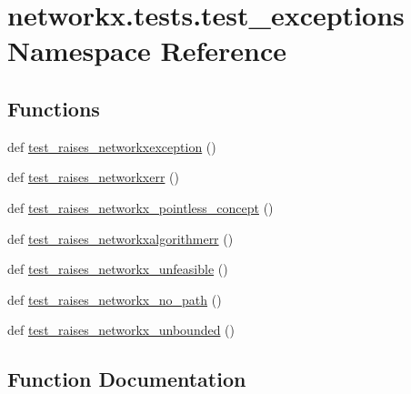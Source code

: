 \hypertarget{namespacenetworkx_1_1tests_1_1test__exceptions}{}\section{networkx.\+tests.\+test\+\_\+exceptions Namespace Reference}
\label{namespacenetworkx_1_1tests_1_1test__exceptions}
\subsection*{Functions}
\begin{DoxyCompactItemize}
\item 
def \hyperlink{namespacenetworkx_1_1tests_1_1test__exceptions_a3899a490542c69a90b205bf33e623ec0}{test\+\_\+raises\+\_\+networkxexception} ()
\item 
def \hyperlink{namespacenetworkx_1_1tests_1_1test__exceptions_a3281e283e10f5ff390b13fbab7ab0fc6}{test\+\_\+raises\+\_\+networkxerr} ()
\item 
def \hyperlink{namespacenetworkx_1_1tests_1_1test__exceptions_a96cf48dc5e1913c1e5348eaf26daec1f}{test\+\_\+raises\+\_\+networkx\+\_\+pointless\+\_\+concept} ()
\item 
def \hyperlink{namespacenetworkx_1_1tests_1_1test__exceptions_a2187ad283f9303a7f75230fcfa398cef}{test\+\_\+raises\+\_\+networkxalgorithmerr} ()
\item 
def \hyperlink{namespacenetworkx_1_1tests_1_1test__exceptions_a6b02c8a5730aa5805612c423eeaae99e}{test\+\_\+raises\+\_\+networkx\+\_\+unfeasible} ()
\item 
def \hyperlink{namespacenetworkx_1_1tests_1_1test__exceptions_a81d65df046110031741618c23ab9ef6f}{test\+\_\+raises\+\_\+networkx\+\_\+no\+\_\+path} ()
\item 
def \hyperlink{namespacenetworkx_1_1tests_1_1test__exceptions_a961621a27f69f37ce792501cd107f150}{test\+\_\+raises\+\_\+networkx\+\_\+unbounded} ()
\end{DoxyCompactItemize}


\subsection{Function Documentation}
\mbox{\label{namespacenetworkx_1_1tests_1_1test__exceptions_a81d65df046110031741618c23ab9ef6f}} 
